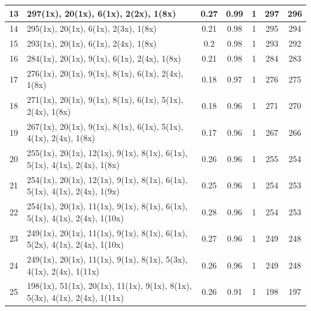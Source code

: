 \begin{small}
\begin{longtable}{|c|p{4cm}|c|c|c|c|c|}
  13 & 297(1x), 20(1x), 6(1x), 2(2x), 1(8x) & \cellcolor{colorGood}  0.27 & \cellcolor{colorGood} 0.99 & 1 & 297 & \cellcolor{colorBad} 296 \\   \hline
  14 & 295(1x), 20(1x), 6(1x), 2(3x), 1(8x) & \cellcolor{colorGood}  0.21 & \cellcolor{colorGood} 0.98 & 1 & 295 & \cellcolor{colorBad} 294 \\   \hline
  15 & 293(1x), 20(1x), 6(1x), 2(4x), 1(8x) & \cellcolor{colorGood}  0.2 & \cellcolor{colorGood} 0.98 & 1 & 293 & \cellcolor{colorBad} 292 \\   \hline
  16 & 284(1x), 20(1x), 9(1x), 6(1x), 2(4x), 1(8x) & \cellcolor{colorGood}  0.21 & \cellcolor{colorGood} 0.98 & 1 & 284 & \cellcolor{colorBad} 283 \\   \hline
  17 & 276(1x), 20(1x), 9(1x), 8(1x), 6(1x), 2(4x), 1(8x) & \cellcolor{colorGood}  0.18 & \cellcolor{colorGood} 0.97 & 1 & 276 & \cellcolor{colorBad} 275 \\   \hline
  18 & 271(1x), 20(1x), 9(1x), 8(1x), 6(1x), 5(1x), 2(4x), 1(8x) & \cellcolor{colorGood}  0.18 & \cellcolor{colorGood} 0.96 & 1 & 271 & \cellcolor{colorBad} 270 \\   \hline
  19 & 267(1x), 20(1x), 9(1x), 8(1x), 6(1x), 5(1x), 4(1x), 2(4x), 1(8x) & \cellcolor{colorGood}  0.17 & \cellcolor{colorGood} 0.96 & 1 & 267 & \cellcolor{colorBad} 266 \\   \hline
  20 & 255(1x), 20(1x), 12(1x), 9(1x), 8(1x), 6(1x), 5(1x), 4(1x), 2(4x), 1(8x) & \cellcolor{colorGood}  0.26 & \cellcolor{colorGood} 0.96 & 1 & 255 & \cellcolor{colorBad} 254 \\   \hline
  21 & 254(1x), 20(1x), 12(1x), 9(1x), 8(1x), 6(1x), 5(1x), 4(1x), 2(4x), 1(9x) & \cellcolor{colorGood}  0.25 & \cellcolor{colorGood} 0.96 & 1 & 254 & \cellcolor{colorBad} 253 \\   \hline
  22 & 254(1x), 20(1x), 11(1x), 9(1x), 8(1x), 6(1x), 5(1x), 4(1x), 2(4x), 1(10x) & \cellcolor{colorGood}  0.28 & \cellcolor{colorGood} 0.96 & 1 & 254 & \cellcolor{colorBad} 253 \\   \hline
  23 & 249(1x), 20(1x), 11(1x), 9(1x), 8(1x), 6(1x), 5(2x), 4(1x), 2(4x), 1(10x) & \cellcolor{colorGood}  0.27 & \cellcolor{colorGood} 0.96 & 1 & 249 & \cellcolor{colorBad} 248 \\   \hline
  24 & 249(1x), 20(1x), 11(1x), 9(1x), 8(1x), 5(3x), 4(1x), 2(4x), 1(11x) & \cellcolor{colorGood}  0.26 & \cellcolor{colorGood} 0.96 & 1 & 249 & \cellcolor{colorBad} 248 \\   \hline
  25 & 198(1x), 51(1x), 20(1x), 11(1x), 9(1x), 8(1x), 5(3x), 4(1x), 2(4x), 1(11x) & \cellcolor{colorGood}  0.26 & \cellcolor{colorGood} 0.91 & 1 & 198 & \cellcolor{colorBad} 197 \\   \hline

\end{longtable}
\end{small}
